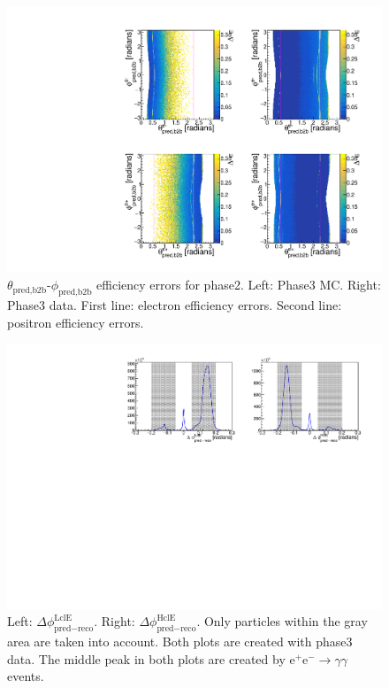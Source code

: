\documentclass[a4paper,11pt,twosided,final,german,openbib,pdftex,listof=totoc,bibliography=totoc]{scrbook}
\begin{document}
\begin{appendix}
\begin{figure}[!htbp]
	\centering
	\includegraphics[width=\textwidth]{Plots/master3/xCEffTP_MCData_ErrorP3.pdf}
	\caption[$\theta_{\textrm{pred,b2b}}$-$\phi_{\textrm{pred,b2b}}$ Efficiency Error Plots Phase3]{$\theta_{\textrm{pred,b2b}}$-$\phi_{\textrm{pred,b2b}}$ efficiency errors for phase2. Left: Phase3 MC. Right: Phase3 data. First line: electron efficiency errors. Second line: positron efficiency errors.}
	\label{plt:xCEff_ErrorP3}
\end{figure}



\begin{figure}[h!]
	\centering
	\includegraphics[width=\textwidth]{Plots/master3/hb2b_DataP3.pdf}
	\caption[b2bClusterPhi - clusterPhi For Phase3 Data]{Left: $\Delta \phi _{\textrm{pred} - \textrm{reco}}^{\textrm{LclE}}$. Right:  $\Delta \phi _{\textrm{pred} - \textrm{reco}}^{\textrm{HclE}}$. Only particles within the gray area are taken into account. Both plots are created with phase3 data. The middle peak in both plots are created by $\textrm{e}^+\textrm{e}^- \rightarrow \gamma \gamma$ events.}
	\label{fig:b2bData3}
\end{figure}





\end{appendix}
\end{document}
